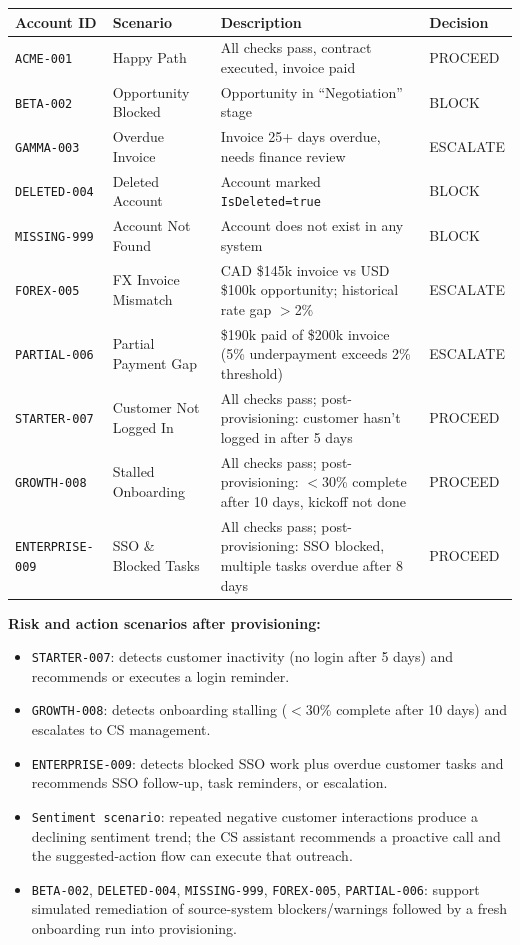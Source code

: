 \documentclass[8pt,a4paper]{article}
\begin{document}
\vspace{0.05em}
\begin{table}[H]
\scriptsize
\begin{tabularx}{\textwidth}{@{}llXl@{}}
\toprule
\textbf{Account ID} & \textbf{Scenario} & \textbf{Description} & \textbf{Decision} \\
\midrule
\texttt{ACME-001} & Happy Path & All checks pass, contract executed, invoice paid & PROCEED \\
\texttt{BETA-002} & Opportunity Blocked & Opportunity in ``Negotiation'' stage & BLOCK \\
\texttt{GAMMA-003} & Overdue Invoice & Invoice 25+ days overdue, needs finance review & ESCALATE \\
\texttt{DELETED-004} & Deleted Account & Account marked \texttt{IsDeleted=true} & BLOCK \\
\texttt{MISSING-999} & Account Not Found & Account does not exist in any system & BLOCK \\
\texttt{FOREX-005} & FX Invoice Mismatch & CAD \$145k invoice vs USD \$100k opportunity; historical rate gap $>$2\% & ESCALATE \\
\texttt{PARTIAL-006} & Partial Payment Gap & \$190k paid of \$200k invoice (5\% underpayment exceeds 2\% threshold) & ESCALATE \\
\texttt{STARTER-007} & Customer Not Logged In & All checks pass; post-provisioning: customer hasn't logged in after 5 days & PROCEED \\
\texttt{GROWTH-008} & Stalled Onboarding & All checks pass; post-provisioning: $<$30\% complete after 10 days, kickoff not done & PROCEED \\
\texttt{ENTERPRISE-009} & SSO \& Blocked Tasks & All checks pass; post-provisioning: SSO blocked, multiple tasks overdue after 8 days & PROCEED \\
\bottomrule
\end{tabularx}
\end{table}

{\scriptsize
\textbf{Risk and action scenarios after provisioning:}
\begin{itemize}[leftmargin=1.2em]
\item \texttt{STARTER-007}: detects customer inactivity (no login after 5 days) and recommends or executes a login reminder.
\item \texttt{GROWTH-008}: detects onboarding stalling ($<$30\% complete after 10 days) and escalates to CS management.
\item \texttt{ENTERPRISE-009}: detects blocked SSO work plus overdue customer tasks and recommends SSO follow-up, task reminders, or escalation.
\item \texttt{Sentiment scenario}: repeated negative customer interactions produce a declining sentiment trend; the CS assistant recommends a proactive call and the suggested-action flow can execute that outreach.
\item \texttt{BETA-002}, \texttt{DELETED-004}, \texttt{MISSING-999}, \texttt{FOREX-005}, \texttt{PARTIAL-006}: support simulated remediation of source-system blockers/warnings followed by a fresh onboarding run into provisioning.
\end{itemize}
}
\end{document}
